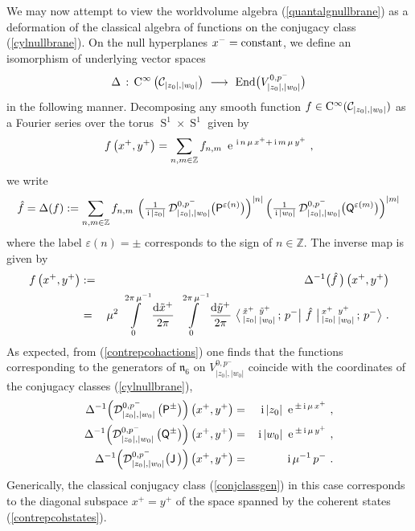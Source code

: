 \documentclass[11pt,a4paper]{article}
\DeclareMathOperator{\Sphere}{S}
\let\S\Sphere
\newcommand{\ii}{{\rm i}}
\def\ii{{\,{\rm i}\,}}
\def\dd{{\rm d}}
\def\P{{\sf P}}
\def\Q{{\sf Q}}
\def\J{{\sf J}}
\newcommand{\zed}{{\mathbb Z}} %
\def\nn{\nonumber}
\def\e{{\,\rm e}\,}
\def\bea{\begin{eqnarray}}
\def\eea{\end{eqnarray}}
\newcommand{\beq}{\begin{eqnarray}}
\newcommand{\eeq}{\end{eqnarray}}
\begin{document}
We may now attempt to view the worldvolume algebra
(\ref{quantalgnullbrane}) as a deformation of the classical algebra of
functions on the conjugacy class (\ref{cylnullbrane}). On the null
hyperplanes $x^-={\rm constant}$, we define an isomorphism of
underlying vector spaces
\beq
\Delta\,:\,{\rm C}^\infty\left(\mathcal{C}_{|z_0|,|w_0|}
\right)~\longrightarrow~{\rm End}\bigl(V_{|z_0|,|w_0|}^{0,p^-}\bigr)
\label{Deltanullbranes}\eeq
in the following manner. Decomposing any smooth function $f\in{\rm
  C}^\infty(\mathcal{C}_{|z_0|,|w_0|})$ as a Fourier series over
the torus $\S^1\times\S^1$ given by
\beq
f\left(x^+,y^+\right)=\sum_{n,m\in\zed}f_{n,m}~\e^{\ii n\,\mu\,x^+
+\ii m\,\mu\,y^+} \ ,
\label{Fourierfnull}\eeq
we write
\beq
\hat f=\Delta(f):=\sum_{n,m\in\zed}f_{n,m}~
\Bigl(\mbox{$\frac1{\ii|z_0|}$}\,\mathcal{D}^{0,p^-}_{|z_0|,|w_0|}
\bigl(\P^{\varepsilon(n)}\bigr)\Bigr)^{|n|}\,\Bigl(
\mbox{$\frac1{\ii|w_0|}$}\,\mathcal{D}^{0,p^-}_{|z_0|,|w_0|}
\bigl(\Q^{\varepsilon(m)}\bigr)\Bigr)^{|m|}
\label{hatfDeltanull}\eeq
where the label $\varepsilon(n)=\pm$ corresponds to the sign of
$n\in\zed$. The inverse map is given by
\bea
f\left(x^+,y^+\right)&:=&\Delta^{-1}\bigl(\hat f\,\bigr)\left(x^+,y^+
\right)\nn\\&=&\mu^2\,\int\limits_0^{2\pi\,\mu^{-1}}\frac{\dd\tilde x^+}{2\pi}~
\int\limits_0^{2\pi\,\mu^{-1}}\frac{\dd\tilde y^+}{2\pi}~
\bigl\langle\,{}^{\tilde x^+}_{|z_0|}\,{}^{\tilde y^+}_{|w_0|}\,
;\,p^-\bigr|~\hat f~\bigl|\,{}^{x^+}_{|z_0|}\,{}^{y^+}_{|w_0|}\,;
\,p^-\bigr\rangle \ .
\label{invDeltanull}\eea
As expected, from (\ref{contrepcohactions}) one finds that the
functions corresponding to the generators of $\mathfrak{n}_6$ on
$V_{|z_0|,|w_0|}^{0,p^-}$ coincide with the coordinates of the
conjugacy classes (\ref{cylnullbrane}),
\bea
\Delta^{-1}\Bigl(\mathcal{D}^{0,p^-}_{|z_0|,|w_0|}\left(\P^\pm\right)
\Bigr)\left(x^+,y^+\right)&=&\ii|z_0|~\e^{\pm\ii \mu\,x^+} \ , \nn\\
\Delta^{-1}\Bigl(\mathcal{D}^{0,p^-}_{|z_0|,|w_0|}\left(\Q^\pm\right)
\Bigr)\left(x^+,y^+\right)&=&\ii|w_0|~\e^{\pm\ii \mu\,y^+} \ , \nn\\
\Delta^{-1}\Bigl(\mathcal{D}^{0,p^-}_{|z_0|,|w_0|}\bigl(\J\,\bigr)
\Bigr)\left(x^+,y^+\right)&=&\ii\mu^{-1}\,p^- \ .
\label{nullfnsgens}\eeq
Generically, the classical conjugacy class (\ref{conjclassgen}) in
this case corresponds to the diagonal subspace $x^+=y^+$ of the space
spanned by the coherent states (\ref{contrepcohstates}).
\end{document}
